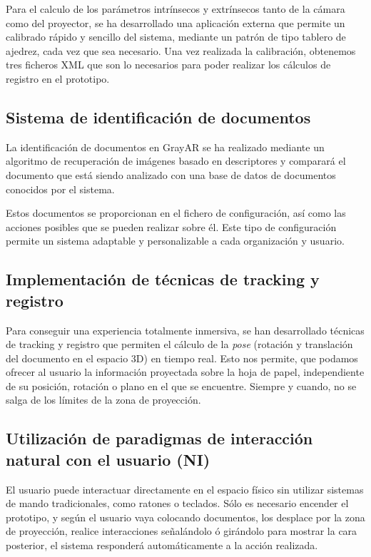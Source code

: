 Para el calculo de los parámetros intrínsecos y extrínsecos tanto de la cámara como del proyector, se ha desarrollado una aplicación externa que permite un calibrado rápido y sencillo del sistema, mediante un patrón de tipo tablero de ajedrez, cada vez que sea necesario. Una vez realizada la calibración, obtenemos tres ficheros XML que son lo necesarios para poder realizar los cálculos de registro en el prototipo. 

\subsection{Sistema de identificación de documentos}
La identificación de documentos en GrayAR se ha realizado mediante un algoritmo de recuperación de imágenes basado en descriptores y comparará el documento que está siendo analizado con una base de datos de documentos conocidos por el sistema.

Estos documentos se proporcionan en el fichero de configuración, así como las acciones posibles que se pueden realizar sobre él. Este tipo de configuración permite un sistema adaptable y personalizable a cada organización y usuario. 

\subsection{Implementación de técnicas de tracking y registro}
Para conseguir una experiencia totalmente inmersiva, se han desarrollado técnicas de tracking y registro que permiten el cálculo de la \emph{pose} (rotación y translación del documento en el espacio 3D) en tiempo real. Esto nos permite, que podamos ofrecer al usuario la información proyectada sobre la hoja de papel, independiente de su posición, rotación o plano en el que se encuentre. Siempre y cuando, no se salga de los límites de la zona de proyección.

\subsection{Utilización de paradigmas de interacción natural con el usuario  (NI)}
El usuario puede interactuar directamente en el espacio físico sin utilizar sistemas de mando tradicionales, como ratones o teclados. Sólo es necesario encender el prototipo, y según el usuario vaya colocando documentos, los desplace por la zona de proyección, realice interacciones señalándolo ó girándolo para mostrar la cara posterior, el sistema responderá automáticamente a la acción realizada. 

